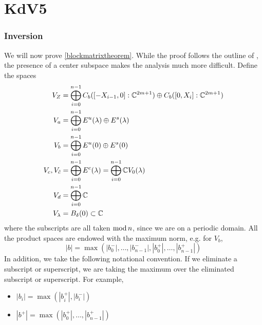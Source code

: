 \documentclass[thesis.tex]{subfiles}
\begin{document}
\iffulldocument\else
	\chapter{KdV5}
\fi

\subsection{Inversion}

We will now prove \cref{blockmatrixtheorem}. While the proof follows the outline of \cite[Theorem 2]{Sandstede1998}, the presence of a center subspace makes the analysis much more difficult. Define the spaces
\begin{align*}
V_Z &= \bigoplus_{i=0}^{n-1} C_b([-X_{i-1},0]:\mathbb{C}^{2m+1}) \oplus C_b([0,X_i]:\mathbb{C}^{2m+1})  \\
V_a &= \bigoplus_{i=0}^{n-1} E^u(\lambda) \oplus E^s(\lambda) \\
V_b &= \bigoplus_{i=0}^{n-1} E^u(0) \oplus E^s(0) \\
V_c, V_{\tilde{c}} &= \bigoplus_{i=0}^{n-1} E^c(\lambda) = \bigoplus_{i=0}^{n-1} \mathbb{C} V_0(\lambda) \\
V_d &= \bigoplus_{i=0}^{n-1} \mathbb{C} \\
V_\lambda &= B_\delta(0) \subset \mathbb{C}
\end{align*}
where the subscripts are all taken $\mathop\mathrm{mod}\nolimits n$, since we are on a periodic domain. All the product spaces are endowed with the maximum norm, e.g. for $V_b$, 
\[
|b| = \max(|b_0^-|, \dots, |b_{n-1}^-|, |b_0^+|, \dots, |b_{n-1}^+|)
\]
In addition, we take the following notational convention. If we eliminate a subscript or superscript, we are taking the maximum over the eliminated subscript or superscript. For example,
\begin{itemize}
	\item $|b_i| = \max(|b_i^+|, |b_i^-|)$ 
	\item $|b^+| = \max(|b_0^+|, \dots, |b_{n-1}^+|)$
\end{itemize}
\end{document}
